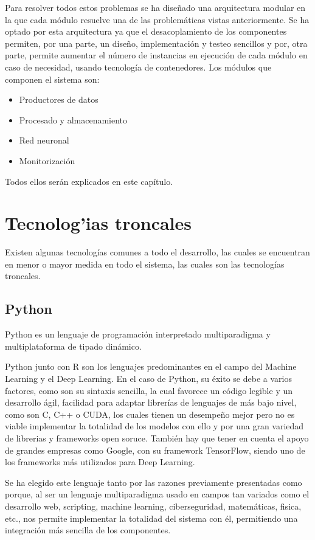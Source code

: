 Para resolver todos estos problemas se ha diseñado una arquitectura modular en la que cada módulo resuelve una de las problemáticas vistas anteriormente. Se ha optado por esta arquitectura ya que el desacoplamiento de los componentes permiten, por una parte, un diseño, implementación y testeo sencillos y por, otra parte, permite aumentar el número de instancias en ejecución de cada módulo en caso de necesidad, usando tecnología de contenedores. Los módulos que componen el sistema son:
\begin{itemize}
\item Productores de datos
\item Procesado y almacenamiento
\item Red neuronal
\item Monitorización
\end{itemize}

Todos ellos serán explicados en este capítulo.


\pagebreak

\section{Tecnolog'ias troncales}
Existen algunas tecnologías comunes a todo el desarrollo, las cuales se encuentran en menor o mayor medida en todo el sistema, las cuales son las tecnologías troncales.

\subsection{Python}
Python es un lenguaje de programación interpretado multiparadigma y multiplataforma de tipado dinámico.

Python junto con R son los lenguajes predominantes en el campo del Machine Learning y el Deep Learning. En el caso de Python, su éxito se debe a varios factores, como son su sintaxis sencilla, la cual favorece un código legible y un desarrollo ágil, facilidad para adaptar librerías de lenguajes de más bajo nivel, como son C, C++ o CUDA, los cuales tienen un desempeño mejor pero no es viable implementar la totalidad de los modelos con ello y por una gran variedad de librerias y frameworks open soruce. También hay que tener en cuenta el apoyo de grandes empresas como Google, con su framework TensorFlow, siendo uno de los frameworks más utilizados para Deep Learning.

Se ha elegido este lenguaje tanto por las razones previamente presentadas como porque, al ser un lenguaje multiparadigma usado en campos tan variados como el desarrollo web, scripting, machine learning, ciberseguridad, matemáticas, fisica, etc., nos permite implementar la totalidad del sistema con él, permitiendo una integración más sencilla de los componentes.



